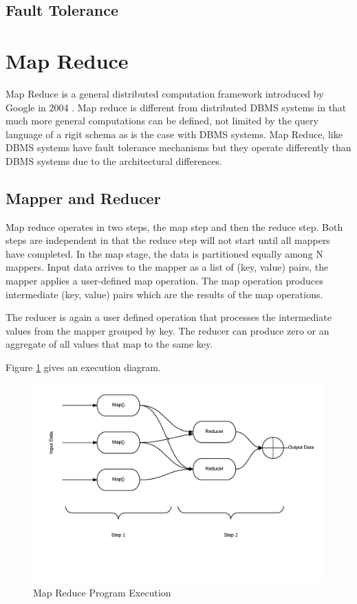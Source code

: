 \documentclass[10pt,twocolumn]{IEEEtran11}
\begin{document}
\subsection{Fault Tolerance}


\section {Map Reduce}

Map Reduce is a general distributed computation framework introduced by Google in 2004 \cite{dean2001mapreduce}.  Map reduce is different from distributed DBMS systems in that much more general computations can be defined, not limited by the query language of a rigit schema as is the case with DBMS systems.  Map Reduce, like DBMS systems have fault tolerance mechanisms but they operate differently than DBMS systems due to the architectural differences. 

\subsection{Mapper and Reducer}
Map reduce operates in two steps, the map step and then the reduce step.  Both steps are independent in that the reduce step will not start until all mappers have completed.
In the map stage, the data is partitioned equally among N mappers.  Input data arrives to the mapper as a list of (key, value) pairs, the mapper applies a user-defined map operation.
The map operation produces intermediate (key, value) pairs which are the results of the map operations.  
\par
The reducer is again a user defined operation that processes the intermediate values from the mapper grouped by key.  The reducer can produce zero or an aggregate of all values
that map to the same key.

Figure \ref{fig:mapReduce} gives an execution diagram.
\begin{figure}[h]
\centering
\includegraphics[scale=0.50]{images/mapReduce.png}
\caption{Map Reduce Program Execution}
\label{fig:mapReduce}
\end{figure}
\end{document}
